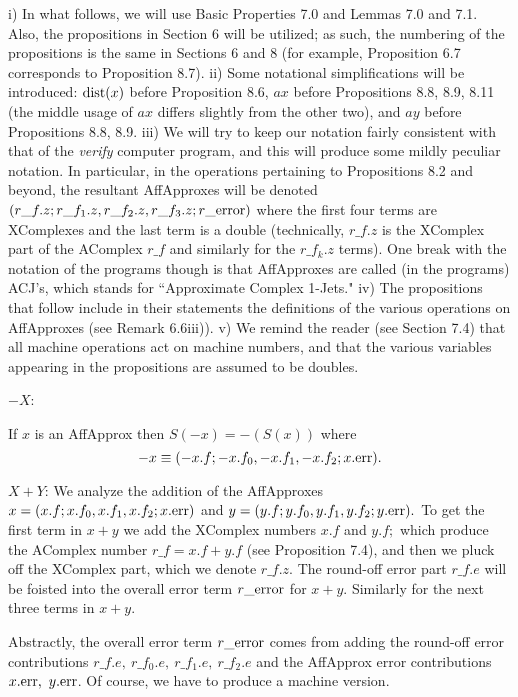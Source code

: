 i)  In what follows, we will use Basic Properties 7.0 and Lemmas 7.0 and 7.1.  Also, the propositions in Section 6
will be utilized;  as such, the numbering of the propositions is the same in Sections 6 and 8 (for example,
Proposition 6.7 corresponds to Proposition 8.7).  
ii)  Some notational simplifications will be introduced: ${\rm dist}(x)$ before Proposition 8.6, $ax$ before Propositions 8.8, 8.9, 8.11
(the middle usage of $ax$ differs slightly from the other two), and $ay$ before Propositions 8.8, 8.9.
iii)  We will try to keep our notation fairly consistent with that of the {\it verify} computer program, and this will produce some mildly peculiar notation.  In particular, in the operations pertaining to Propositions 8.2 and beyond, the resultant AffApproxes will be denoted $(r\_f.z; r\_f_1.z, r\_f_2.z, 
r\_f_3.z;\break r\_{\rm error})$
where the first four terms are XComplexes and the last term is a double (technically, $r\_f.z$ is the XComplex part of the AComplex  $r\_f$ and similarly for the $r\_f_k.z$ terms).  One break with the notation of the programs though is that AffApproxes are called (in the programs) ACJ's, which stands for ``Approximate Complex 1-Jets."
iv) The propositions that follow include in their statements the definitions of the various operations on AffApproxes (see Remark
6.6iii)).
v)  We remind the reader (see Section 7.4) that all machine operations act on machine numbers, and that the 
various variables appearing in the propositions are assumed to be doubles.
\enddemo

$-X$:

If $x$ is an AffApprox 
then $S(-x) = -(S(x))$ where
$$-x \equiv (-x.f; -x.f_0,-x.f_1,-x.f_2; x.{\rm err}).$$ \endproclaim


$X+Y$:
We analyze the addition of the  {\rm AffApproxes} 
 $x = (x.f; x.f_0,x.f_1,\break x.f_2; x.{\rm err})$  and 
$y = (y.f; y.f_0,y.f_1,y.f_2; y.{\rm err}).$  To get the first term in $x+y$ we add the XComplex numbers $x.f$ and $y.f;$ which
produce the AComplex number $r\_f = x.f + y.f$ (see Proposition 7.4), and then we pluck off the XComplex part,
which we denote $r\_f.z.$  The round-off error part $r\_f.e$ will be foisted into the overall error term $r\_{\rm error}$
for $x+y.$ Similarly for the next three terms in $x + y.$

Abstractly, the overall error term $r\_{\rm error}$ comes from adding the round-off error contributions $r\_f.e,\  r\_f_0.e,\  r\_f_1.e, 
\ r\_f_2.e$ and the AffApprox error contributions $x.{\rm err},\  y.{\rm err}$.  Of course, we have to produce a machine version.

